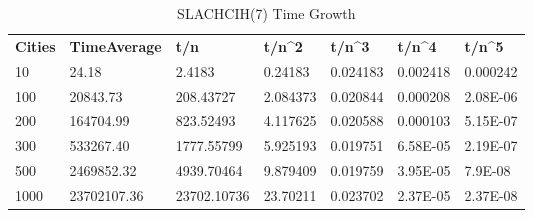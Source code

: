 \begin{table}[H]
\centering
\begin{tabular}{lllllll}
\rowcolor[HTML]{4F81BD} 
{\color[HTML]{FFFFFF} \textbf{Cities}} & {\color[HTML]{FFFFFF} \textbf{TimeAverage}} & {\color[HTML]{FFFFFF} \textbf{t/n}} & {\color[HTML]{FFFFFF} \textbf{t/n\textasciicircum{}2}} & {\color[HTML]{FFFFFF} \textbf{t/n\textasciicircum{}3}} & {\color[HTML]{FFFFFF} \textbf{t/n\textasciicircum{}4}} & {\color[HTML]{FFFFFF} \textbf{t/n\textasciicircum{}5}} \\
\rowcolor[HTML]{B8CCE4} 
10                                     & 24.18                                       & 2.4183                              & 0.24183                                                & 0.024183                                               & 0.002418                                               & 0.000242                                               \\
\rowcolor[HTML]{DCE6F1} 
100                                    & 20843.73                                    & 208.43727                           & 2.084373                                               & 0.020844                                               & 0.000208                                               & 2.08E-06                                               \\
\rowcolor[HTML]{B8CCE4} 
200                                    & 164704.99                                   & 823.52493                           & 4.117625                                               & 0.020588                                               & 0.000103                                               & 5.15E-07                                               \\
\rowcolor[HTML]{DCE6F1} 
300                                    & 533267.40                                   & 1777.55799                          & 5.925193                                               & 0.019751                                               & 6.58E-05                                               & 2.19E-07                                               \\
\rowcolor[HTML]{B8CCE4} 
500                                    & 2469852.32                                  & 4939.70464                          & 9.879409                                               & 0.019759                                               & 3.95E-05                                               & 7.9E-08                                                \\
\rowcolor[HTML]{DCE6F1} 
1000                                   & 23702107.36                                 & 23702.10736                         & 23.70211                                               & 0.023702                                               & 2.37E-05                                               & 2.37E-08                                              
\end{tabular}
\caption{SLACHCIH(7) Time Growth}
\label{tab:Timegrowth}
\end{table}

